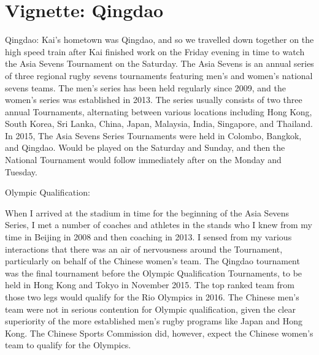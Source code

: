 \section{Vignette: Qingdao}
Qingdao:
Kai's hometown was Qingdao, and so we travelled down together on the high speed train after Kai finished work on the Friday evening in time to watch the Asia Sevens Tournament on the Saturday.  The Asia Sevens is an annual series of three regional rugby sevens tournaments featuring men's and women's national sevens teams.  The men's series has been held regularly since 2009, and the women's series was established in 2013. The series usually consists of two three annual Tournaments, alternating between various locations including Hong Kong, South Korea, Sri Lanka, China, Japan, Malaysia, India, Singapore, and Thailand.  In 2015, The Asia Sevens Series Tournaments were held in Colombo, Bangkok, and Qingdao. Would be played on the Saturday and Sunday, and then the National Tournament would follow immediately after on the Monday and Tuesday.


Olympic Qualification:

When I arrived at the stadium in time for the beginning of the Asia Sevens Series, I met a number of coaches and athletes in the stands who I knew from my time in Beijing in 2008 and then coaching in 2013. I sensed from my various interactions that there was an air of nervousness around the Tournament, particularly on behalf of the Chinese women's team.   The Qingdao tournament was the final tournament before the Olympic Qualification Tournaments, to be held in Hong Kong and Tokyo in November 2015.  The top ranked team from those two legs would qualify for the Rio Olympics in 2016.  The Chinese men's team were not in serious contention for Olympic qualification, given the clear superiority of the more established men's rugby programs like Japan and Hong Kong. The Chinese Sports Commission did, however, expect the Chinese women's team to qualify for the Olympics.

